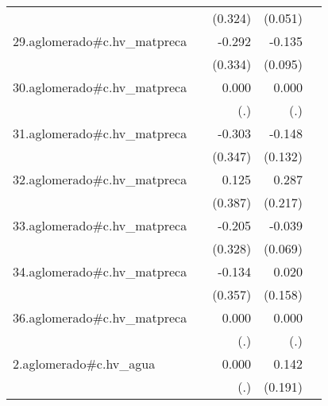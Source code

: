 {\begin{longtable}{l*{4}{D{.}{.}{-1}}}
            &                     &     (0.324)         &     (0.051)         &                     \\
\addlinespace
29.aglomerado#c.hv\_matpreca&                     &      -0.292         &      -0.135         &                     \\
            &                     &     (0.334)         &     (0.095)         &                     \\
\addlinespace
30.aglomerado#c.hv\_matpreca&                     &       0.000         &       0.000         &                     \\
            &                     &         (.)         &         (.)         &                     \\
\addlinespace
31.aglomerado#c.hv\_matpreca&                     &      -0.303         &      -0.148         &                     \\
            &                     &     (0.347)         &     (0.132)         &                     \\
\addlinespace
32.aglomerado#c.hv\_matpreca&                     &       0.125         &       0.287         &                     \\
            &                     &     (0.387)         &     (0.217)         &                     \\
\addlinespace
33.aglomerado#c.hv\_matpreca&                     &      -0.205         &      -0.039         &                     \\
            &                     &     (0.328)         &     (0.069)         &                     \\
\addlinespace
34.aglomerado#c.hv\_matpreca&                     &      -0.134         &       0.020         &                     \\
            &                     &     (0.357)         &     (0.158)         &                     \\
\addlinespace
36.aglomerado#c.hv\_matpreca&                     &       0.000         &       0.000         &                     \\
            &                     &         (.)         &         (.)         &                     \\
\addlinespace
2.aglomerado#c.hv\_agua&                     &       0.000         &       0.142         &                     \\
            &                     &         (.)         &     (0.191)         &                     \\

\end{longtable}}
